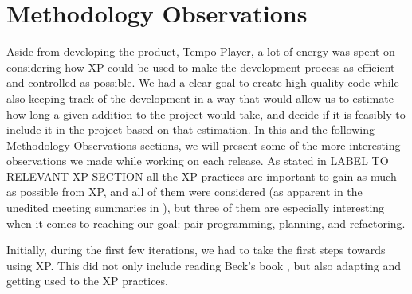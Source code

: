 \section{Methodology Observations}\label{sec:release1Methodology}
Aside from developing the product, Tempo Player, a lot of energy was spent on considering how XP could be used to make the development process as efficient and controlled as possible. We had a clear goal to create high quality code while also keeping track of the development in a way that would allow us to estimate how long a given addition to the project would take, and decide if it is feasibly to include it in the project based on that estimation.
In this and the following Methodology Observations sections, we will present some of the more interesting observations we made while working on each release. As stated in LABEL TO RELEVANT XP SECTION all the XP practices are important to gain as much as possible from XP, and all of them were considered (as apparent in the unedited meeting summaries in ), but three of them are especially interesting when it comes to reaching our goal: pair programming, planning, and refactoring.\\ 

Initially, during the first few iterations, we had to take the first steps towards using XP. This did not only include reading Beck's book , but also adapting and getting used to the XP practices.









